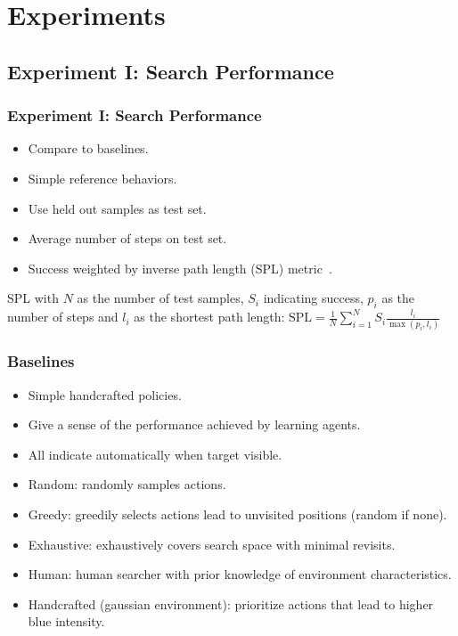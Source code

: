 \section{Experiments}

\subsection{Experiment I: Search Performance}

\begin{frame}
    \frametitle{Experiment I: Search Performance}

    \begin{itemize}
        \item Compare to baselines.
        \item Simple reference behaviors.
        \item Use held out samples as test set.
        \item Average number of steps on test set.
        \item Success weighted by inverse path length (SPL) metric~\cite{anderson_evaluation_2018}.
    \end{itemize}

    \begin{definition}{SPL}
        with \(N\) as the number of test samples, \(S_i\) indicating success, \(p_i\) as the number of steps and \(l_i\) as the shortest path length:
        \(\text{SPL} = \frac{1}{N} \sum_{i=1}^N S_i \frac{l_i}{\max(p_i,l_i)}\)
    \end{definition}
\end{frame}

\begin{frame}
    \frametitle{Baselines}

    \begin{itemize}
        \item Simple handcrafted policies.
        \item Give a sense of the performance achieved by learning agents.
        \item All indicate automatically when target visible.
    \end{itemize}

    \begin{itemize}
        \item Random: randomly samples actions.
        \item Greedy: greedily selects actions lead to unvisited positions (random if none).
        \item Exhaustive: exhaustively covers search space with minimal revisits.
        \item Human: human searcher with prior knowledge of environment characteristics.
        \item Handcrafted (gaussian environment): prioritize actions that lead to higher blue intensity.
    \end{itemize}
\end{frame}

